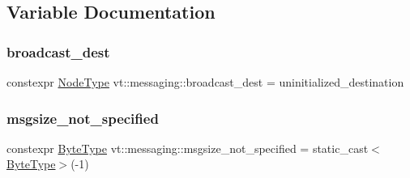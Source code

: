 \subsection{Variable Documentation}
\mbox{\label{namespacevt_1_1messaging_a11d2b356f56486f2e60f0255cb6b05ff}} 
\subsubsection{\texorpdfstring{broadcast\+\_\+dest}{broadcast\_dest}}
{\footnotesize\ttfamily constexpr \hyperlink{namespacevt_a866da9d0efc19c0a1ce79e9e492f47e2}{Node\+Type} vt\+::messaging\+::broadcast\+\_\+dest = uninitialized\+\_\+destination}

\mbox{\label{namespacevt_1_1messaging_adefd943a6421b1b7120526f969bee20f}} 
\subsubsection{\texorpdfstring{msgsize\+\_\+not\+\_\+specified}{msgsize\_not\_specified}}
{\footnotesize\ttfamily constexpr \hyperlink{namespacevt_aab8d55968084610ce3b17057981e9300}{Byte\+Type} vt\+::messaging\+::msgsize\+\_\+not\+\_\+specified = static\+\_\+cast$<$\hyperlink{namespacevt_aab8d55968084610ce3b17057981e9300}{Byte\+Type}$>$(-\/1)}

